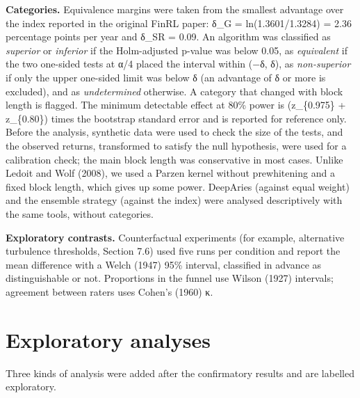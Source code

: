 \documentclass[12pt,a4paper]{report}
\begin{document}
\textbf{Categories.} Equivalence margins were taken from the smallest
advantage over the index reported in the original FinRL paper: δ\_G =
ln(1.3601/1.3284) = 2.36 percentage points per year and δ\_SR = 0.09. An
algorithm was classified as \emph{superior} or \emph{inferior} if the
Holm-adjusted p-value was below 0.05, as \emph{equivalent} if the two
one-sided tests at α/4 placed the interval within (−δ, δ), as
\emph{non-superior} if only the upper one-sided limit was below δ (an
advantage of δ or more is excluded), and as \emph{undetermined}
otherwise. A category that changed with block length is flagged. The
minimum detectable effect at 80\% power is (z\_\{0.975\} + z\_\{0.80\})
times the bootstrap standard error and is reported for reference only.
Before the analysis, synthetic data were used to check the size of the
tests, and the observed returns, transformed to satisfy the null
hypothesis, were used for a calibration check; the main block length was
conservative in most cases. Unlike Ledoit and Wolf (2008), we used a
Parzen kernel without prewhitening and a fixed block length, which gives
up some power. DeepAries (against equal weight) and the ensemble
strategy (against the index) were analysed descriptively with the same
tools, without categories.

\textbf{Exploratory contrasts.} Counterfactual experiments (for example,
alternative turbulence thresholds, Section 7.6) used five runs per
condition and report the mean difference with a Welch (1947) 95\%
interval, classified in advance as distinguishable or not. Proportions
in the funnel use Wilson (1927) intervals; agreement between raters uses
Cohen's (1960) κ.

\section{Exploratory analyses}\label{exploratory-analyses}

Three kinds of analysis were added after the confirmatory results and
are labelled exploratory.
\end{document}

